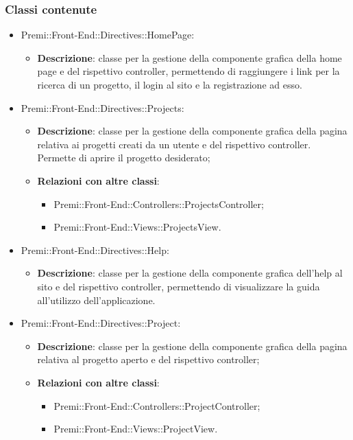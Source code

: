 \subsubsection{Classi contenute}
\begin{itemize}
	\item Premi::Front-End::Directives::HomePage:
	\begin{itemize}
		\item \textbf{Descrizione}: classe per la gestione della componente grafica della home page e del rispettivo controller, permettendo di raggiungere i link per la ricerca di un progetto, il login al sito e la registrazione ad esso.
	\end{itemize}

    \item Premi::Front-End::Directives::Projects:
	\begin{itemize}
		\item \textbf{Descrizione}: classe per la gestione della componente grafica della pagina relativa ai progetti creati da un utente e del rispettivo controller. Permette di aprire il progetto desiderato;
		\item \textbf{Relazioni con altre classi}:
		\begin{itemize}
			\item Premi::Front-End::Controllers::ProjectsController;
			\item Premi::Front-End::Views::ProjectsView.
		\end{itemize}
	\end{itemize}

    \item Premi::Front-End::Directives::Help:
	\begin{itemize}
		\item \textbf{Descrizione}: classe per la gestione della componente grafica dell'help al sito e del rispettivo controller, permettendo di visualizzare la guida all'utilizzo dell'applicazione.
	\end{itemize}

    \item Premi::Front-End::Directives::Project:
	\begin{itemize}
		\item \textbf{Descrizione}: classe per la gestione della componente grafica della pagina relativa al progetto aperto e del rispettivo controller;
		\item \textbf{Relazioni con altre classi}:
		\begin{itemize}
			\item Premi::Front-End::Controllers::ProjectController;
			\item Premi::Front-End::Views::ProjectView.
		\end{itemize}
	\end{itemize}


\end{itemize}

